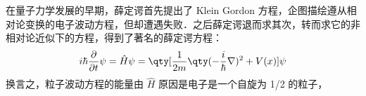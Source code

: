 

在量子力学发展的早期，薛定谔首先提出了 Klein Gordon 方程，企图描绘遵从相对论变换的电子波动方程，但却遭遇失败．之后薛定谔退而求其次，转而求它的非相对论近似下的方程，得到了著名的薛定谔方程：
\begin{equation}
i\hbar \frac{\partial }{\partial t}\psi = \hat H\psi=\qty[\frac{ 1}{2m}\qty(-\frac{i}{\hbar}\nabla)^2+V(x)]\psi
\end{equation}
换言之，粒子波动方程的能量由 $\hat H$
原因是电子是一个自旋为 1/2 的粒子，